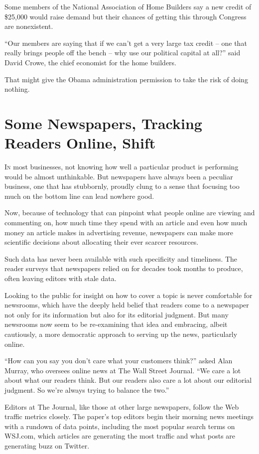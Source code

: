 ﻿\documentclass[12pt]{article}
\begin{document}
Some members of the National Association of Home Builders say a new credit of \$25,000 would raise
demand but their chances of getting this through Congress are nonexistent.

``Our members are saying that if we can't get a very large tax credit -- one that really brings
people off the bench -- why use our political capital at all?'' said David Crowe, the chief
economist for the home builders.

That might give the Obama administration permission to take the risk of doing nothing.

\pagebreak
\section{Some Newspapers, Tracking Readers Online, Shift}

\lettrine{I}{n} most businesses, not knowing how well a particular product
is performing would be almost unthinkable. But newspapers have always been a peculiar business, one
that has stubbornly, proudly clung to a sense that focusing too much on the bottom line can lead
nowhere good.

Now, because of technology that can pinpoint what people online are viewing and commenting on, how
much time they spend with an article and even how much money an article makes in advertising
revenue, newspapers can make more scientific decisions about allocating their ever scarcer
resources.

Such data has never been available with such specificity and timeliness. The reader surveys that
newspapers relied on for decades took months to produce, often leaving editors with stale data.

Looking to the public for insight on how to cover a topic is never comfortable for newsrooms, which
have the deeply held belief that readers come to a newspaper not only for its information but also
for its editorial judgment. But many newsrooms now seem to be re-examining that idea and embracing,
albeit cautiously, a more democratic approach to serving up the news, particularly online.

``How can you say you don't care what your customers think?'' asked Alan Murray, who oversees online
news at The Wall Street Journal. ``We care a lot about what our readers think. But our readers also
care a lot about our editorial judgment. So we're always trying to balance the two.''

Editors at The Journal, like those at other large newspapers, follow the Web traffic metrics
closely. The paper's top editors begin their morning news meetings with a rundown of data points,
including the most popular search terms on WSJ.com, which articles are generating the most traffic
and what posts are generating buzz on Twitter.
\end{document}
